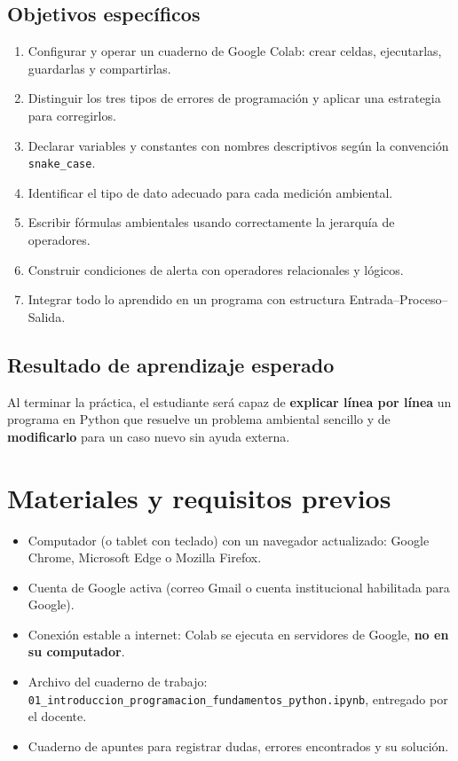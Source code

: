 \documentclass[11pt,a4paper]{article}
\newcommand{\code}[1]{\texttt{#1}}
\newcommand{\nbfile}{\texttt{01\_\allowbreak introduccion\_\allowbreak programacion\_\allowbreak fundamentos\_\allowbreak python.ipynb}}
\begin{document}
\subsection{Objetivos específicos}
\begin{enumerate}
  \item Configurar y operar un cuaderno de Google Colab: crear celdas, ejecutarlas, guardarlas y compartirlas.
  \item Distinguir los tres tipos de errores de programación y aplicar una estrategia para corregirlos.
  \item Declarar variables y constantes con nombres descriptivos según la convención \code{snake\_case}.
  \item Identificar el tipo de dato adecuado para cada medición ambiental.
  \item Escribir fórmulas ambientales usando correctamente la jerarquía de operadores.
  \item Construir condiciones de alerta con operadores relacionales y lógicos.
  \item Integrar todo lo aprendido en un programa con estructura Entrada--Proceso--Salida.
\end{enumerate}

\subsection{Resultado de aprendizaje esperado}
Al terminar la práctica, el estudiante será capaz de \textbf{explicar línea por línea} un programa en Python que resuelve un problema ambiental sencillo y de \textbf{modificarlo} para un caso nuevo sin ayuda externa.

\section{Materiales y requisitos previos}

\begin{itemize}
  \item Computador (o tablet con teclado) con un navegador actualizado: Google Chrome, Microsoft Edge o Mozilla Firefox.
  \item Cuenta de Google activa (correo Gmail o cuenta institucional habilitada para Google).
  \item Conexión estable a internet: Colab se ejecuta en servidores de Google, \textbf{no en su computador}.
  \item Archivo del cuaderno de trabajo: \nbfile{}, entregado por el docente.
  \item Cuaderno de apuntes para registrar dudas, errores encontrados y su solución.
\end{itemize}
\end{document}
